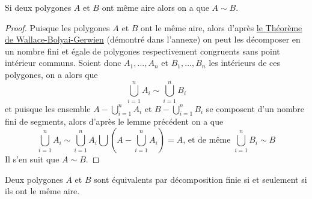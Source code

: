 \begin{TTT}
  Si deux polygones $A$ et $B$ ont même aire alors on a que $A \sim B$.
\end{TTT}
\begin{proof}
  Puisque les polygones $A$ et $B$ ont le même aire, alors d'après \hyperref[wbg]{le Théorème de Wallace-Bolyai-Gerwien} (démontré dans l'annexe) on peut les décomposer en un nombre fini et égale de polygones respectivement congruents sans point intérieur communs. Soient donc $A_1, ..., A_n$ et $B_1,...,B_n$ les intérieurs de ces polygones, on a alors que $$\bigcup_{i=1}^n A_i \sim \bigcup_{i=1}^n B_i$$
  et puisque les ensemble $A - \bigcup_{i=1}^n A_i$ et $B -\bigcup_{i=1}^n B_i$ se composent d'un nombre fini de segments,  alors d'après le lemme précédent on a que $$\bigcup_{i=1}^n A_i \sim \bigcup_{i=1}^n A_i \bigcup \left(A - \bigcup_{i=1}^n A_i\right)=A \text{, et de même } \bigcup_{i=1}^n B_i \sim B$$
  Il s'en suit que $A \sim B$.
\end{proof}
\begin{Coo}
  Deux polygones $A$ et $B$ sont équivalents par décomposition finie si et seulement si ils ont le même aire.
\end{Coo}
